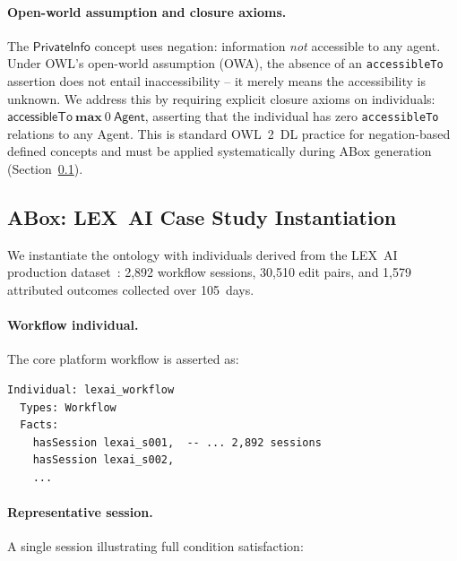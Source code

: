 \documentclass[11pt]{article}
\begin{document}
\paragraph{Open-world assumption and closure axioms.}
The $\mathsf{PrivateInfo}$ concept uses negation: information \emph{not} accessible to any agent.
Under OWL's open-world assumption (OWA), the absence of an \texttt{accessibleTo} assertion does not entail inaccessibility -- it merely means the accessibility is unknown.
We address this by requiring explicit closure axioms on individuals: $\mathsf{accessibleTo}\ \textbf{max}\ 0\ \mathsf{Agent}$, asserting that the individual has zero \texttt{accessibleTo} relations to any Agent.
This is standard OWL~2~DL practice for negation-based defined concepts and must be applied systematically during ABox generation (Section~\ref{sec:abox}).

\subsection{ABox: LEX~AI Case Study Instantiation}
\label{sec:abox}

We instantiate the ontology with individuals derived from the LEX~AI production dataset~\citep{ovcharov2025citation,ovcharov2025statute}: 2{,}892 workflow sessions, 30{,}510 edit pairs, and 1{,}579 attributed outcomes collected over 105~days.

\paragraph{Workflow individual.}
The core platform workflow is asserted as:

\begin{small}
\begin{verbatim}
Individual: lexai_workflow
  Types: Workflow
  Facts:
    hasSession lexai_s001,  -- ... 2,892 sessions
    hasSession lexai_s002,
    ...
\end{verbatim}
\end{small}

\paragraph{Representative session.}
A single session illustrating full condition satisfaction:
\end{document}
